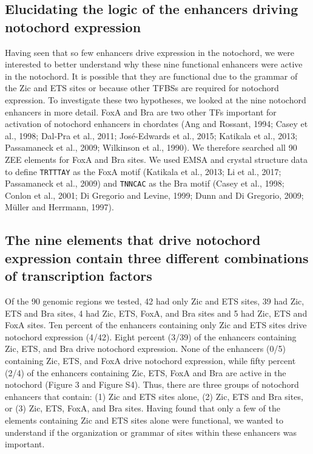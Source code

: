 \subsection{Elucidating the logic of the enhancers driving notochord expression}

Having seen that so few enhancers drive expression in the notochord, we were interested to better understand why these nine functional enhancers were active in the notochord. It is possible that they are functional due to the grammar of the Zic and ETS sites or because other TFBSs are required for notochord expression. To investigate these two hypotheses, we looked at the nine notochord enhancers in more detail. FoxA and Bra are two other TFs important for activation of notochord enhancers in chordates (Ang and Rossant, 1994; Casey et al., 1998; Dal-Pra et al., 2011; José-Edwards et al., 2015; Katikala et al., 2013; Passamaneck et al., 2009; Wilkinson et al., 1990). We therefore searched all 90 ZEE elements for FoxA and Bra sites. We used EMSA and crystal structure data to define \verb|TRTTTAY| as the FoxA motif (Katikala et al., 2013; Li et al., 2017; Passamaneck et al., 2009) and \verb|TNNCAC| as the Bra motif  (Casey et al., 1998; Conlon et al., 2001; Di Gregorio and Levine, 1999; Dunn and Di Gregorio, 2009; Müller and Herrmann, 1997). 

\subsection{The nine elements that drive notochord expression contain three different combinations of transcription factors}

Of the 90 genomic regions we tested, 42 had only Zic and ETS sites, 39 had Zic, ETS and Bra sites, 4 had Zic, ETS, FoxA, and Bra sites and 5 had Zic, ETS and FoxA sites. Ten percent of the enhancers containing only Zic and ETS sites drive notochord expression (4/42). Eight percent (3/39) of the enhancers containing Zic, ETS, and Bra drive notochord expression. None of the enhancers (0/5) containing Zic, ETS, and FoxA drive notochord expression, while fifty percent (2/4) of the enhancers containing Zic, ETS, FoxA and Bra are active in the notochord (Figure 3 and Figure S4). Thus, there are three groups of notochord enhancers that contain: (1) Zic and ETS sites alone, (2) Zic, ETS and Bra sites, or (3) Zic, ETS, FoxA, and Bra sites. Having found that only a few of the elements containing Zic and ETS sites alone were functional, we wanted to understand if the organization or grammar of sites within these enhancers was important.

